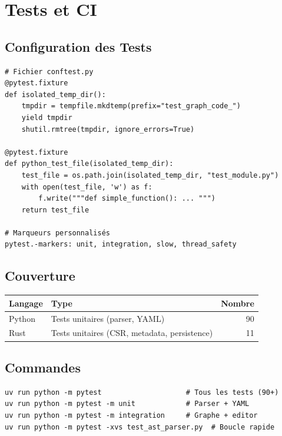 \documentclass[12pt,a4paper]{article}
\begin{document}
\section{Tests et CI}

\subsection{Configuration des Tests}

\begin{lstlisting}
# Fichier conftest.py
@pytest.fixture
def isolated_temp_dir():
    tmpdir = tempfile.mkdtemp(prefix="test_graph_code_")
    yield tmpdir
    shutil.rmtree(tmpdir, ignore_errors=True)

@pytest.fixture
def python_test_file(isolated_temp_dir):
    test_file = os.path.join(isolated_temp_dir, "test_module.py")
    with open(test_file, 'w') as f:
        f.write("""def simple_function(): ... """)
    return test_file

# Marqueurs personnalisés
pytest.-markers: unit, integration, slow, thread_safety
\end{lstlisting}

\subsection{Couverture}

\begin{center}
\begin{tabularx}{\textwidth}{lXr}
\toprule
\textbf{Langage} & \textbf{Type} & \textbf{Nombre} \\
\midrule
Python & Tests unitaires (parser, YAML) & 90 \\
Rust & Tests unitaires (CSR, metadata, persistence) & 11 \\
\bottomrule
\end{tabularx}
\end{center}

\subsection{Commandes}

\begin{lstlisting}
uv run python -m pytest                    # Tous les tests (90+)
uv run python -m pytest -m unit            # Parser + YAML
uv run python -m pytest -m integration     # Graphe + editor
uv run python -m pytest -xvs test_ast_parser.py  # Boucle rapide
\end{lstlisting}
\end{document}
